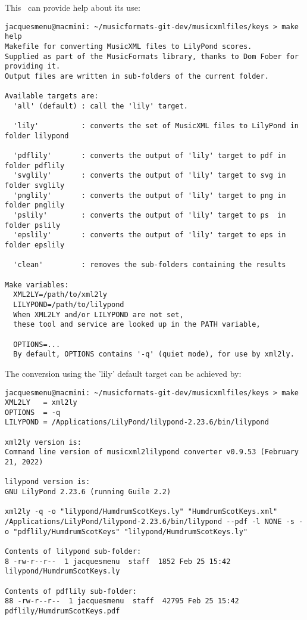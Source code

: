 This \Makefile\ can provide help about its use:
\begin{lstlisting}[language=Terminal]
jacquesmenu@macmini: ~/musicformats-git-dev/musicxmlfiles/keys > make help
Makefile for converting MusicXML files to LilyPond scores.
Supplied as part of the MusicFormats library, thanks to Dom Fober for providing it.
Output files are written in sub-folders of the current folder.

Available targets are:
  'all' (default) : call the 'lily' target.

  'lily'          : converts the set of MusicXML files to LilyPond in folder lilypond

  'pdflily'       : converts the output of 'lily' target to pdf in folder pdflily
  'svglily'       : converts the output of 'lily' target to svg in folder svglily
  'pnglily'       : converts the output of 'lily' target to png in folder pnglily
  'pslily'        : converts the output of 'lily' target to ps  in folder pslily
  'epslily'       : converts the output of 'lily' target to eps in folder epslily

  'clean'         : removes the sub-folders containing the results

Make variables:
  XML2LY=/path/to/xml2ly
  LILYPOND=/path/to/lilypond
  When XML2LY and/or LILYPOND are not set,
  these tool and service are looked up in the PATH variable,

  OPTIONS=...
  By default, OPTIONS contains '-q' (quiet mode), for use by xml2ly.
\end{lstlisting}

The conversion using the 'lily' default target can be achieved by:
\begin{lstlisting}[language=Terminal]
jacquesmenu@macmini: ~/musicformats-git-dev/musicxmlfiles/keys > make
XML2LY   = xml2ly
OPTIONS  = -q
LILYPOND = /Applications/LilyPond/lilypond-2.23.6/bin/lilypond

xml2ly version is:
Command line version of musicxml2lilypond converter v0.9.53 (February 21, 2022)

lilypond version is:
GNU LilyPond 2.23.6 (running Guile 2.2)

xml2ly -q -o "lilypond/HumdrumScotKeys.ly" "HumdrumScotKeys.xml"
/Applications/LilyPond/lilypond-2.23.6/bin/lilypond --pdf -l NONE -s -o "pdflily/HumdrumScotKeys" "lilypond/HumdrumScotKeys.ly"

Contents of lilypond sub-folder:
8 -rw-r--r--  1 jacquesmenu  staff  1852 Feb 25 15:42 lilypond/HumdrumScotKeys.ly

Contents of pdflily sub-folder:
88 -rw-r--r--  1 jacquesmenu  staff  42795 Feb 25 15:42 pdflily/HumdrumScotKeys.pdf
\end{lstlisting}

